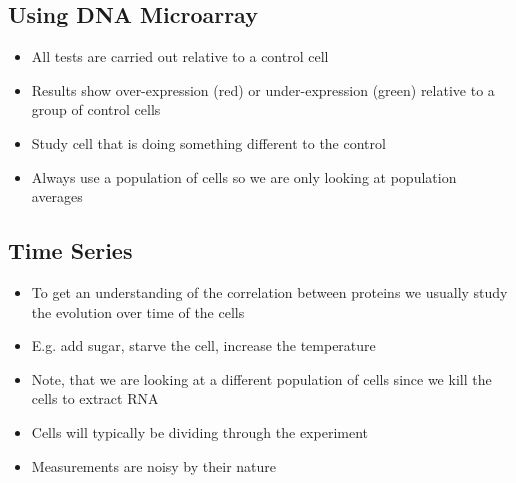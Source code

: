 
\begin{slide}
\section{Using DNA Microarray}

\begin{PauseHighLight}
  \begin{itemize}
  \item All tests are carried out relative to a control cell\pause
  \item Results show over-expression (red) or under-expression (green)
    relative to a group of control cells\pause
  \item Study cell that is doing something different to the
    control\pause
  \item Always use a population of cells so we are only looking at
    population averages\pause
  \end{itemize}
\end{PauseHighLight}

\end{slide}


\begin{slide}
\section{Time Series}

\begin{PauseHighLight}
  \begin{itemize}
  \item To get an understanding of the correlation between proteins we
    usually study the evolution over time of the cells\pause
  \item E.g. add sugar, starve the cell, increase the temperature\pause
  \item Note, that we are looking at a different population of cells
    since we kill the cells to extract RNA\pause
  \item Cells will typically be dividing through the experiment\pause
  \item Measurements are noisy by their nature\pause
  \end{itemize}
\end{PauseHighLight}

\end{slide}

